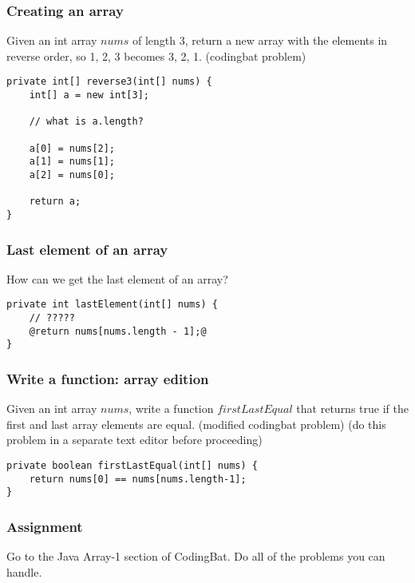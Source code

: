 \documentclass{beamer}
\begin{document}
\begin{frame}[fragile]
\frametitle{Creating an array}
Given an int array $nums$ of length 3, return a new array with the elements in reverse order, so {1, 2, 3} becomes {3, 2, 1}. (codingbat problem)
\begin{lstlisting}[style=basenopause]
private int[] reverse3(int[] nums) {
    int[] a = new int[3];
    
    // what is a.length?
    
    a[0] = nums[2];
    a[1] = nums[1];
    a[2] = nums[0];
    
    return a;
}
\end{lstlisting}
\end{frame}

\begin{frame}[fragile]
\frametitle{Last element of an array}
How can we get the last element of an array?

\begin{lstlisting}[style=hiddencode]
private int lastElement(int[] nums) {
    // ?????
    @return nums[nums.length - 1];@
}
\end{lstlisting}
\pause
\end{frame}

\begin{frame}[fragile]
\frametitle{Write a function: array edition}
Given an int array $nums$, write a function $firstLastEqual$ that returns true if the first and last array elements are equal. (modified codingbat problem)
\pause 
(do this problem in a separate text editor before proceeding)
\pause
\begin{lstlisting}
private boolean firstLastEqual(int[] nums) {
    return nums[0] == nums[nums.length-1];
}
\end{lstlisting}
\end{frame}

\begin{frame}
\frametitle{Assignment}
Go to the Java Array-1 section of CodingBat. Do all of the problems you can handle.
\end{frame}
\end{document}
